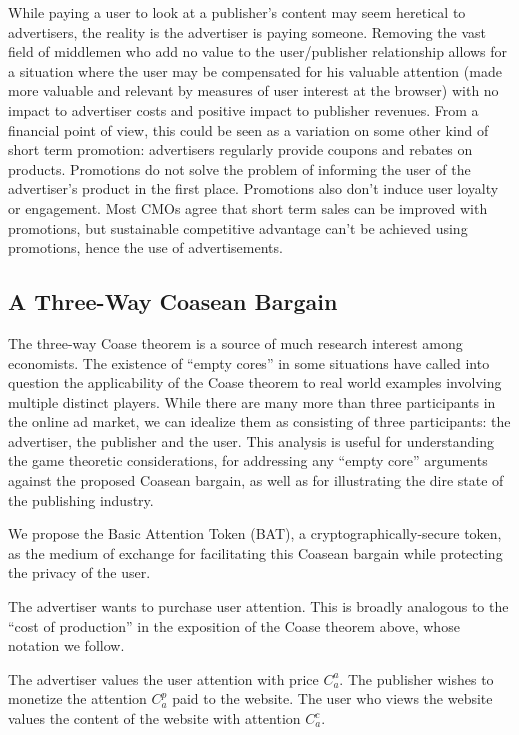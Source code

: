 \documentclass[11pt]{article}
\begin{document}
While paying a user to look at a publisher’s content may seem
heretical to advertisers, the reality is the advertiser is paying
someone. Removing the vast field of middlemen who add no
value to the user/publisher relationship allows for a situation where
the user may be compensated for his valuable attention (made more
valuable and relevant by measures of user interest at the browser)
with no impact to advertiser costs and positive impact to publisher
revenues. From a financial point of view, this could be seen as a
variation on some other kind of short term promotion: advertisers
regularly provide coupons and rebates on products. Promotions do not
solve the problem of informing the user of the advertiser’s product in
the first place. Promotions also don’t induce user loyalty or
engagement. Most CMOs agree that short term sales can be improved with
promotions, but sustainable competitive advantage can’t be achieved
using promotions, hence the use of advertisements. 

\subsection{A Three-Way Coasean Bargain}
\label{sec-8-2}

The three-way Coase theorem is a source of much research interest
among economists. The existence of ``empty cores'' in some situations
have called into question the applicability of the Coase theorem to
real world examples involving multiple distinct players\cite{20}. While there
are many more than three participants in the online ad market, we can
idealize them as consisting of three participants: the advertiser, the
publisher and the user. This analysis is useful for understanding the
game theoretic considerations, for addressing any ``empty core''
arguments against the proposed Coasean bargain, as well as for
illustrating the dire state of the publishing industry. 

We propose the Basic Attention Token (BAT), a cryptographically-secure
token, as the medium of exchange for facilitating this Coasean bargain
while protecting the privacy of the user.

The advertiser wants to purchase user attention. This is broadly
analogous to the ``cost of production'' in the exposition of the Coase
theorem above, whose notation we follow. 

The advertiser values the user attention with price $C^{a}_a$. The publisher wishes to 
monetize the attention $C^{p}_a$ paid to the website. The user who views the website 
values the content of the website with attention $C^{c}_a$.
\end{document}
